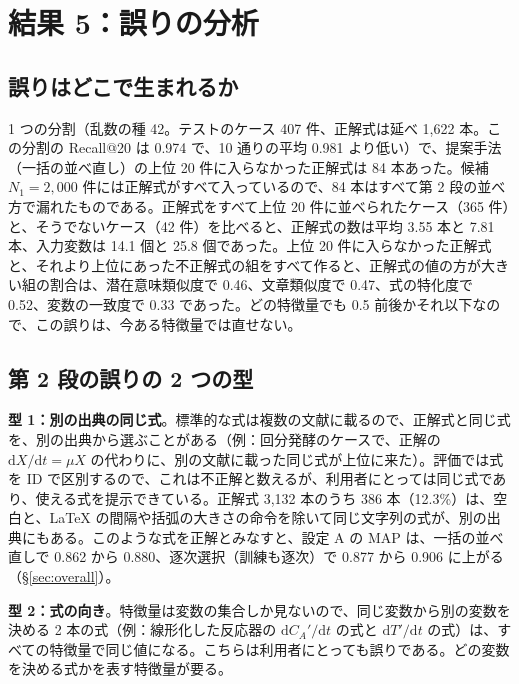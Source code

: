 \documentclass[11pt,a4paper]{ltjsarticle}
\begin{document}
\section{結果 5：誤りの分析}\label{sec:error}
\subsection{誤りはどこで生まれるか}\label{sec:errwhere}
1 つの分割（乱数の種 42。テストのケース 407 件、正解式は延べ 1{,}622 本。この分割の Recall@20 は 0.974 で、10 通りの平均 0.981 より低い）で、提案手法（一括の並べ直し）の上位 20 件に入らなかった正解式は 84 本あった。候補 $N_1 = 2{,}000$ 件には正解式がすべて入っているので、84 本はすべて第 2 段の並べ方で漏れたものである。正解式をすべて上位 20 件に並べられたケース（365 件）と、そうでないケース（42 件）を比べると、正解式の数は平均 3.55 本と 7.81 本、入力変数は 14.1 個と 25.8 個であった。上位 20 件に入らなかった正解式と、それより上位にあった不正解式の組をすべて作ると、正解式の値の方が大きい組の割合は、潜在意味類似度で 0.46、文章類似度で 0.47、式の特化度で 0.52、変数の一致度で 0.33 であった。どの特徴量でも 0.5 前後かそれ以下なので、この誤りは、今ある特徴量では直せない。

\subsection{第 2 段の誤りの 2 つの型}\label{sec:errtypes}
\textbf{型 1：別の出典の同じ式}。標準的な式は複数の文献に載るので、正解式と同じ式を、別の出典から選ぶことがある（例：回分発酵のケースで、正解の $\mathrm{d}X/\mathrm{d}t = \mu X$ の代わりに、別の文献に載った同じ式が上位に来た）。評価では式を ID で区別するので、これは不正解と数えるが、利用者にとっては同じ式であり、使える式を提示できている。正解式 3{,}132 本のうち 386 本（12.3\%）は、空白と、\LaTeX{} の間隔や括弧の大きさの命令を除いて同じ文字列の式が、別の出典にもある。このような式を正解とみなすと、設定 A の MAP は、一括の並べ直しで 0.862 から 0.880、逐次選択（訓練も逐次）で 0.877 から 0.906 に上がる（\S\ref{sec:overall}）。

\textbf{型 2：式の向き}。特徴量は変数の集合しか見ないので、同じ変数から別の変数を決める 2 本の式（例：線形化した反応器の $\mathrm{d}C_A'/\mathrm{d}t$ の式と $\mathrm{d}T'/\mathrm{d}t$ の式）は、すべての特徴量で同じ値になる。こちらは利用者にとっても誤りである。どの変数を決める式かを表す特徴量が要る。
\end{document}
